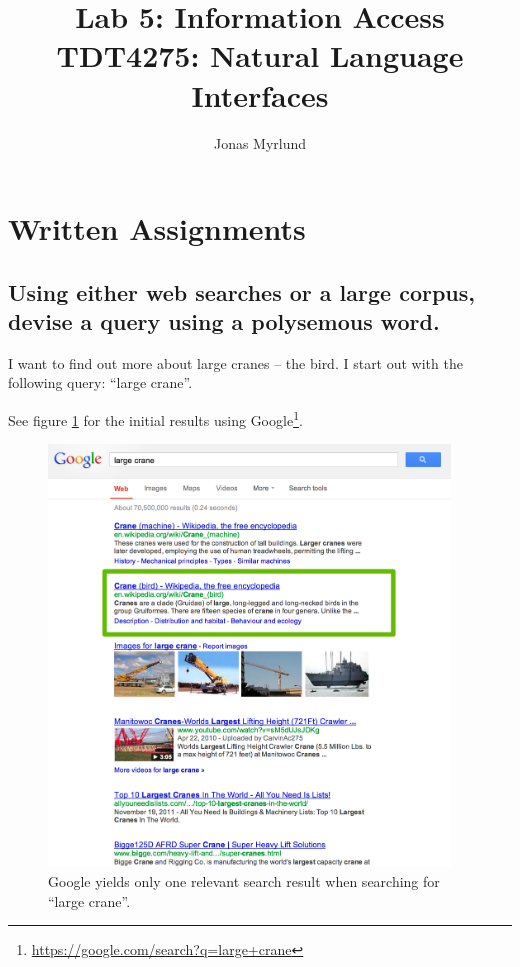 \documentclass[11pt,a4paper]{article}
\begin{document}
  \title{Lab 5: Information Access \\ \large{TDT4275: Natural Language Interfaces}}
  \author{Jonas Myrlund}

  \maketitle

  \section{Written Assignments} %
  \label{sec:written_assignments}

    \subsection{Using either web searches or a large corpus, devise a query using a polysemous word.} %
    \label{sub:using_either_web_searches_or_a_large_corpus_devise_a_query_using_a_polysemous_word_}

      I want to find out more about large cranes -- the bird. I start out with the following query:
      ``large crane''.

      See figure \ref{fig:large_crane_google} for the initial results using Google\footnote{\url{https://google.com/search?q=large+crane}}.

      \begin{figure}
        \includegraphics[width=0.95\textwidth]{imgs/large_crane_google}
        \caption{Google yields only one relevant search result when searching for ``large crane''.}
        \label{fig:large_crane_google}
      \end{figure}
\end{document}
